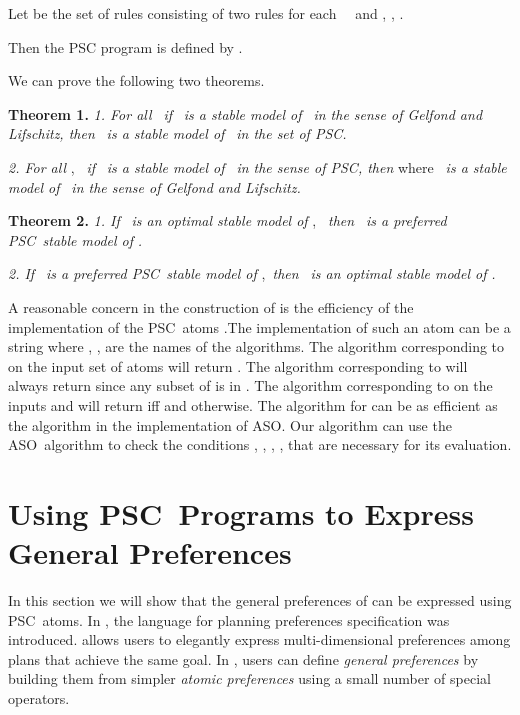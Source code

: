 \documentclass[letterpaper]{article}\usepackage{aaai}
\begin{document}
Let  be the set of rules consisting of two rules for each 
\  \ and , ,
.

Then the PSC program  is defined by .

We can prove the following two theorems.

\textbf{Theorem 1. }\textit{1. For all }\textit{\ if }\textit{\ is a stable model of }\textit{\ in the sense of Gelfond
and Lifschitz, then }\textit{\ is a stable model of }\textit{\ in the set of PSC.}

\textit{2. For all }, \textit{\ if }\textit{\ is a stable model of }\textit{\ in the sense of PSC, then } where  \textit{\ is a stable model of }\textit{\ in the sense of Gelfond and Lifschitz.}

\textbf{Theorem 2. }\textit{1. If }\textit{\ is an optimal stable model of
}, \textit{\ then }\textit{\ is a preferred PSC\ stable model of }\textit{.}

\textit{2. If }\textit{\ is a preferred PSC\ stable model of },\textit{\ then }\textit{\ is an optimal stable model of
}\textit{.} \newline

A reasonable concern in the construction of  is the efficiency of the
implementation of the PSC\ atoms .The implementation of such an atom can be
a string  where , ,  are
the names of the algorithms. The algorithm corresponding to  on the input
set of atoms  will return . The
algorithm corresponding to  will always return  since any subset of
 is in . The algorithm corresponding to
 on the inputs  and  will return  iff
 and  otherwise. The algorithm for 
can be as efficient as the algorithm in the implementation of ASO. Our
algorithm can use the ASO\ algorithm to check the conditions , , , ,  that
are necessary for its evaluation.

\section{Using PSC\ Programs to Express General Preferences}

In this section we will show that the general preferences of \cite{SP} can be
expressed using PSC\ atoms. In \cite{SP}, the language  for
planning preferences specification was introduced.  allows users
to elegantly express multi-dimensional preferences among plans that achieve
the same goal. In , users can define \emph{general preferences}
by building them from simpler \emph{atomic preferences} using a small number
of special operators.
\end{document}
